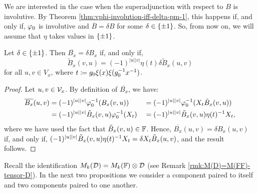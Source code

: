 We are interested in the case when the superadjunction with respect to $B$ is involutive.
By Theorem \ref{thm:vphi-involution-iff-delta-pm-1}, this happens if, and only if, $\varphi_0$ is involutive and $\overline B = \delta B$ for some $\delta \in \{ \pm 1 \}$.
So, from now on, we will assume that $\eta$ takes values in $\{ \pm 1 \}$.

\begin{lemma}\label{lemma:B_x-delta}
	Let $\delta \in \{ \pm 1 \}$.
	Then $\overline{B_x} = \delta B_x$ if, and only if,
	\[
		\tilde{B}_x (v, u) = (-1)^{|u| |v|} \eta(t) \delta \tilde{B}_x (u, v)
	\]
	for all $u, v \in V_x$, where $t \coloneqq g_0 \xi(x) \xi(g_0^{-1} x^{-1})$.
\end{lemma}

\begin{proof}
	Let $u,v \in \mathcal V_x$.
	By definition of $\overline{B_x}$, we have:
	\begin{alignat*}{3}
		\overline{B_x} (u, v) & = (-1)^{|u||v|} \varphi_0^{-1}( B_x(v, u) )
		                      &                                                  & = (-1)^{|u||v|} \varphi_0^{-1}( X_t \tilde{B}_x(v, u) ) \\
		                      & = (-1)^{|u||v|} \tilde{B}_x(v, u) \varphi_0^{-1}(X_t)
		                      &                                                  & = (-1)^{|u||v|} \tilde{B}_x(v, u) \eta(t)^{-1} X_t,
	\end{alignat*}
	where we have used the fact that $\tilde B_x (v, u) \in \mathbb{F}$.
	Hence, $\overline{B_x} (u, v) = \delta {B_x} (u, v)$ if, and only if,
	$(-1)^{|u||v|} \tilde{B}_x(v, u) \eta(t)^{-1} X_t = \delta X_t \tilde{B}_x(u, v)$, and the result follows.
\end{proof}

Recall the identification $M_k (\mathcal{D}) = M_k(\mathbb{F}) \otimes \mathcal{D}$ (see Remark \ref{rmk:M(D)=M(FF)-tensor-D}).
In the next two propositions we consider a component paired to itself and two components paired to one another.


